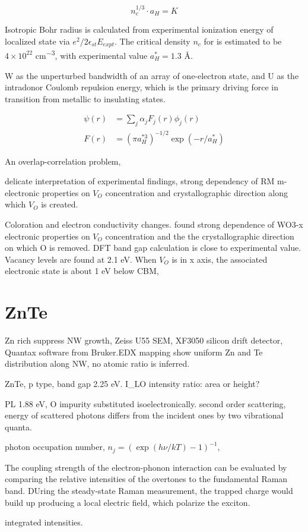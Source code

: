 \[
n_c^{1/3}\cdot a_H = K
\]

Isotropic Bohr radius is calculated from experimental ionization energy of localized state via $e^2/2\epsilon_{st} E_{expt}$.
The critical density $n_c$ for  is estimated to be $4\times 10^{22}$ \si{cm^{-3}}, with experimental value $a_H^* = 1.3$ \si{\angstrom}. 

W as the unperturbed bandwidth of an array of one-electron state, and U as the intradonor Coulomb repulsion energy, which is the primary driving force in transition from metallic to insulating states. 


\begin{align}
\psi(r) &= \sum_j \alpha_j F_j(r)\phi_j(r)\\
F(r) &= (\pi a_H^{*3})^{-1/2} \exp(-r/a_H^*)
\end{align}

An overlap-correlation problem, 

delicate interpretation of experimental findings, strong dependency of RM m- electronic properties on $V_O$ concentration and crystallographic direction along which $V_O$ is created.\cite{Wang2011b} 

Coloration and electron conductivity changes. \citeauthor{Wang2011b} found strong dependence of WO3-x electronic properties on $V_O$ concentration and the the crystallographic direction on which O is removed. DFT band gap calculation is close to experimental value. Vacancy levels are found at 2.1 eV. When $V_O$ is in x axis, the associated electronic state is about 1 eV below CBM, 

\section{ZnTe}

Zn rich suppress NW growth, Zeiss U55 SEM, XF3050 silicon drift detector, Quantax software from Bruker.EDX mapping show uniform Zn and Te distribution along NW, no atomic ratio is inferred. \cite{Rueda-Fonseca2014} 

ZnTe, p type, band gap 2.25 eV. I_LO intensity ratio: area or height? 

PL 1.88 eV, O impurity substituted isoelectronically. second order scattering, energy of scattered photons differs from the incident ones by two vibrational quanta.  \cite{Irwin1970}

photon occupation number, $n_j = (\exp(h\nu/kT) - 1)^{-1}$, 


The coupling strength of the electron-phonon interaction can be evaluated by comparing the relative intensities of the overtones to the fundamental Raman band. DUring the steady-state Raman measurement, the trapped charge would build up producing a local electric field, which polarize the exciton. \cite{Zhang2012}

integrated intensities. 















